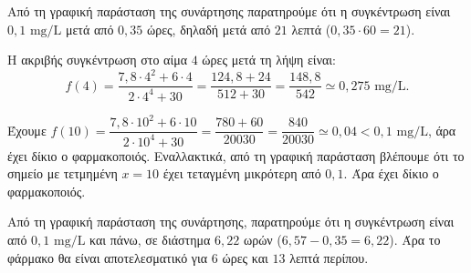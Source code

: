 
\begin{alist}
\item
\begin{rlist}
\item Από τη γραφική παράσταση της συνάρτησης παρατηρούμε ότι η συγκέντρωση είναι $0,1\text{ mg/L}$ μετά από $0,35$ ώρες, δηλαδή μετά από $21$ λεπτά ($0,35 \cdot 60 = 21$).
\item H ακριβής συγκέντρωση στο αίμα $4$ ώρες μετά τη λήψη είναι:
\[f(4) = \dfrac{7,8 \cdot 4^2 + 6 \cdot 4}{2 \cdot 4^4 + 30} = \dfrac{124,8 + 24}{512 + 30} = \dfrac{148,8}{542} \simeq 0,275\text{ mg/L}.\]
\end{rlist}

\item
\begin{rlist}
\item Έχουμε $f(10) = \dfrac{7,8 \cdot 10^2 + 6 \cdot 10}{2 \cdot 10^4 + 30} = \dfrac{780 + 60}{20030} = \dfrac{840}{20030} \simeq 0,04 < 0,1\text{ mg/L}$, άρα έχει δίκιο ο φαρμακοποιός.
Εναλλακτικά, από τη γραφική παράσταση βλέπουμε ότι το σημείο με τετμημένη $x = 10$ έχει τεταγμένη μικρότερη από $0,1$. Άρα έχει δίκιο ο φαρμακοποιός.
\item Από τη γραφική παράσταση της συνάρτησης, παρατηρούμε ότι η συγκέντρωση είναι από $0,1\text{ mg/L}$ και πάνω, σε διάστημα $6,22$ ωρών ($6,57 - 0,35 = 6,22$). Άρα το φάρμακο θα είναι αποτελεσματικό για $6$ ώρες και $13$ λεπτά περίπου.
\end{rlist}
\end{alist}

